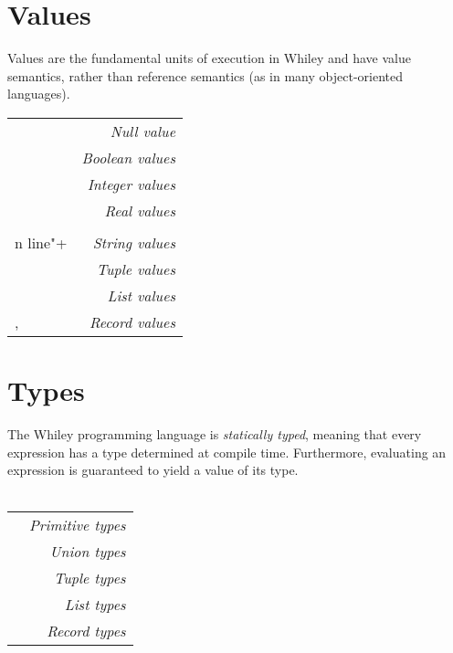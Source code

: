 \documentclass[a4paper,10pt,twcolumn]{article}
\date{}
\newcommand{\token}[1]{\Large\strut\scriptsize\fcolorbox{black}{lightgray}{\strut#1}}
\begin{document}

\section*{Values}
Values are the fundamental units of execution in Whiley and have value semantics, rather than reference semantics (as in many object-oriented languages).

\noindent \begin{tabular}{l r}
\token{\lstinline+null+} & {\em Null value}\\
\token{\lstinline+true+} \token{\lstinline+false+} & {\em Boolean values}\\
\token{\lstinline+123+} \token{\lstinline+-99+} \token{\lstinline+0xFF+} & {\em Integer values}\\
\token{\lstinline+1.23+} \token{\lstinline+-0.02+} & {\em Real values}\\
\token{\lstinline+"Hello"+} \token{\lstinline+"new\\n line"+} & {\em String values}\\
\token{\lstinline+(1,2,3)+} \token{\lstinline+(true,null)+} & {\em Tuple values}\\
\token{\lstinline+[]+} \token{\lstinline+[1,2,3]+} \token{\lstinline+[1,"hello",2.0]+} & {\em List values}\\
\token{\lstinline+\{name: "dave"\}+}, \token{\lstinline+\{x: 1, y: 0\}+} & {\em Record values}\\
\end{tabular}
\section*{Types}
The Whiley programming language is {\em statically typed}, meaning that every expression has a type determined at compile time.  Furthermore, evaluating an expression is guaranteed to yield a value of its type.\\\\ 
\begin{tabular}{l r}
\token{\lstinline+null+} \token{\lstinline+bool+} \token{\lstinline+int+} \token{\lstinline+real+} \token{\lstinline+string+} & {\em Primitive types}\\
\token{\lstinline+int|null+} \token{\lstinline+bool|int|real+} & {\em Union types}\\
\token{\lstinline+(int,int)+} \token{\lstinline+(int,null,bool)+} & {\em Tuple types}\\
\token{\lstinline+[int]+} \token{\lstinline+[[bool]]+} \token{\lstinline+[int|null]+} & {\em List types}\\
\token{\lstinline+\{bool f\}+} \token{\lstinline+\{int len, [int] is\}+} & {\em Record types}\\
\end{tabular}
\end{document}
